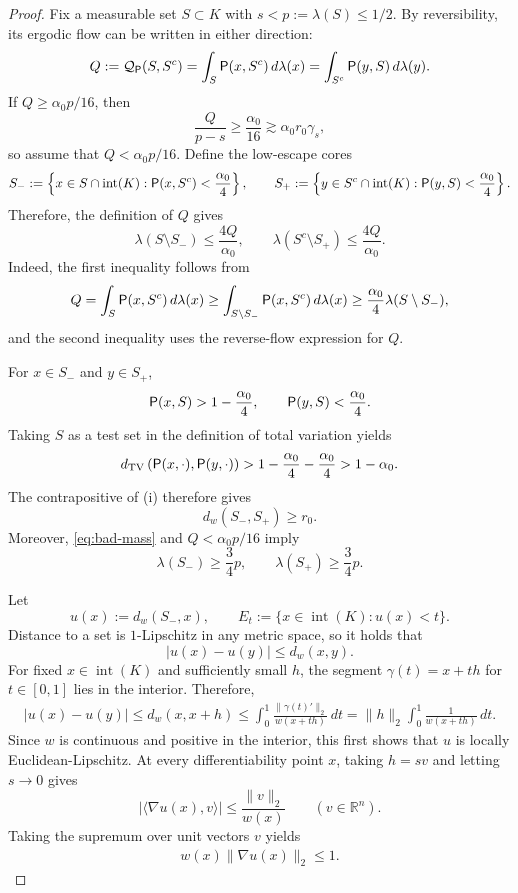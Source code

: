 \documentclass[11pt]{article}
\theoremstyle{definition}
\theoremstyle{remark}
\newcommand{\R}{\mathbb R}
\newcommand{\cQ}{\mathcal Q}
\newcommand{\dtv}{d_{\mathrm{TV}}}
\begin{document}
\begin{proof}
Fix a measurable set $S\subset K$ with
$s<p:=\lambda(S)\le1/2$.  By reversibility, its ergodic flow can be written
in either direction:
\[
 Q
 :=
 \cQ_{\sf P}(S,S^c)
 =
 \int_S{\sf P}(x,S^c)\,d\lambda(x)
 =
 \int_{S^c}{\sf P}(y,S)\,d\lambda(y).
\]
If $Q\ge\alpha_0p/16$, then
\[
 \frac{Q}{p-s}
 \ge\frac{\alpha_0}{16}
 \gtrsim\alpha_0r_0\gamma_s,
\]
so assume that $Q<\alpha_0p/16$.  Define the low-escape cores
\[
 S_-:=
 \left\{
 x\in S\cap\operatorname{int}(K):
 {\sf P}(x,S^c)<\frac{\alpha_0}{4}
 \right\},
 \qquad
 S_+:=
 \left\{
 y\in S^c\cap\operatorname{int}(K):
 {\sf P}(y,S)<\frac{\alpha_0}{4}
 \right\}.
\]
Therefore, the definition of $Q$ gives
\begin{equation}\label{eq:bad-mass}
 \lambda(S\setminus S_-)
 \le\frac{4Q}{\alpha_0},
 \qquad
 \lambda(S^c\setminus S_+)
 \le\frac{4Q}{\alpha_0}.
\end{equation}
Indeed, the first inequality follows from
\begin{align*}
    Q=\int_S{\sf P}(x,S^c)\,d\lambda(x)\geq \int_{S\setminus S_{-}}{\sf P}(x,S^c)\,d\lambda(x)\geq \frac{\alpha_0}{4}\lambda(S\setminus S_-),
\end{align*}
and the second inequality uses the reverse-flow expression for $Q$.

For $x\in S_-$ and $y\in S_+$,
\[
 {\sf P}(x,S)>1-\frac{\alpha_0}{4},
 \qquad
 {\sf P}(y,S)<\frac{\alpha_0}{4}.
\]
Taking $S$ as a test set in the definition of total variation yields
\[
 \dtv\left({\sf P}(x,\cdot),{\sf P}(y,\cdot)\right)
 >
 1-\frac{\alpha_0}{4}-\frac{\alpha_0}{4}
 >
 1-\alpha_0.
\]
The contrapositive of \textup{(i)} therefore gives
\begin{equation}\label{eq:intrinsic-separation}
 d_{w}(S_-,S_+)
 \ge
 r_0.
\end{equation}
Moreover, \eqref{eq:bad-mass} and $Q<\alpha_0p/16$ imply
\begin{equation}\label{eq:surviving-masses}
 \lambda(S_-)\ge\frac{3}{4}p,
 \qquad
 \lambda(S_+)\ge\frac{3}{4}p.
\end{equation}

Let
\[
 u(x):=d_{w}(S_-,x),
 \qquad
 E_t:=\{x\in\operatorname{int}(K):u(x)<t\}.
\]
Distance to a set is $1$-Lipschitz in any metric space, so it holds that
\[
 |u(x)-u(y)|\le d_{w}(x,y).
\]
For fixed $x\in\operatorname{int}(K)$ and sufficiently small $h$, the segment $\gamma(t)=x+th$ for $t\in [0,1]$ lies in the interior. Therefore,
\begin{align*}
    |u(x)-u(y)|\le d_{w}(x,x+h)\le\int_0^1\frac{\|\gamma(t)'\|_2}{w(x+th)}\,dt=\|h\|_2 \int_0^1\frac{1}{w(x+th)}\,dt.
\end{align*}
Since $w$ is continuous and positive in the interior, this first shows that $u$ is locally Euclidean-Lipschitz. At every differentiability point $x$, taking $h=sv$ and letting $s\to0$ gives
\[
 |\langle\nabla u(x),v\rangle|
 \le \frac{\|v\|_2}{w(x)}
 \qquad(v\in\R^n).
\]
Taking the supremum over unit vectors $v$ yields
\begin{align}\label{eq:intrinsic-gradient}
    w(x)\|\nabla u(x)\|_2\le1.
\end{align}



\end{proof}
\end{document}
